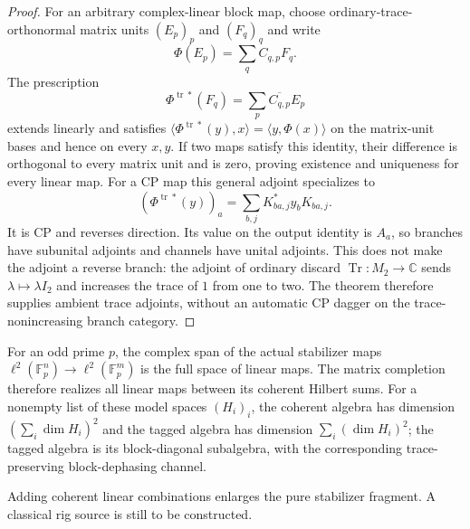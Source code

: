 \begin{proof}
For an arbitrary complex-linear block map, choose ordinary-trace-orthonormal
matrix units $(E_p)_p$ and $(F_q)_q$ and write
\[
 \Phi(E_p)=\sum_q C_{q,p}F_q.
\]
The prescription
\[
 \Phi^{\operatorname{tr}*}(F_q)=\sum_p\overline{C_{q,p}}E_p
\]
extends linearly and satisfies
$\langle\Phi^{\operatorname{tr}*}(y),x\rangle
=\langle y,\Phi(x)\rangle$ on the matrix-unit bases and hence on every
$x,y$.  If two maps satisfy this identity, their difference is orthogonal to
every matrix unit and is zero, proving existence and uniqueness for every
linear map.  For a CP map this general adjoint specializes to
\[
 (\Phi^{\operatorname{tr}*}(y))_a
 =\sum_{b,j}K_{ba,j}^*y_bK_{ba,j}.
\]
It is CP and reverses direction.  Its value on the output identity is $A_a$,
so branches have subunital adjoints and channels have unital adjoints.
This does not make the adjoint a reverse branch: the adjoint of ordinary
discard $\operatorname{Tr}:M_2\to\mathbb C$ sends
$\lambda\mapsto\lambda I_2$ and increases the trace of $1$ from one to two.
The theorem therefore supplies ambient trace adjoints, without an automatic
CP dagger on the trace-nonincreasing branch category.
\end{proof}

\begin{proposition}
\statusProved{}
For an odd prime $p$, the complex span of the actual stabilizer maps $\ell^2(\mathbb
F_p^n)\to\ell^2(\mathbb F_p^m)$ is the full space of linear maps. The matrix
completion therefore realizes all linear maps between its coherent Hilbert sums. For
a nonempty list of these model spaces $(H_i)_i$, the coherent algebra has dimension
$(\sum_i\dim H_i)^2$ and the tagged algebra has dimension $\sum_i(\dim H_i)^2$; the
tagged algebra is its block-diagonal subalgebra, with the corresponding
trace-preserving block-dephasing channel.
\end{proposition}
\begin{scope}
Adding coherent linear combinations enlarges the pure stabilizer fragment. A classical rig source is still to be constructed.
\end{scope}

